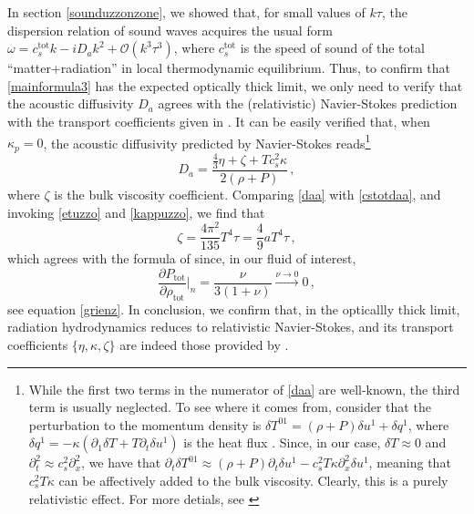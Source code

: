 \documentclass[a4paper, amsfonts, amssymb, amsmath, reprint, showkeys, nofootinbib, twoside,notitlepage,onecolumn]{revtex4-2}
\theoremstyle{definition}
\theoremstyle{theorem}
\theoremstyle{corollary}
\begin{document}
In section \ref{sounduzzonzone}, we showed that, for small values of $k\tau$, the dispersion relation of sound waves acquires the usual form $\omega=c_s^\text{tot} k-iD_a k^2+\mathcal{O}(k^3\tau^3)$, where $c_s^\text{tot}$ is the speed of sound of the total ``matter+radiation'' in local thermodynamic equilibrium. Thus, to confirm that \eqref{mainformula3} has the expected optically thick limit, we only need to verify that the acoustic diffusivity $D_a$ agrees with the (relativistic) Navier-Stokes prediction with the transport coefficients given in \cite{Weinberg1971,UdeyIsrael1982}. It can be easily verified that, when $\kappa_p=0$, the acoustic diffusivity predicted by Navier-Stokes reads\footnote{While the first two terms in the numerator of \eqref{daa} are well-known, the third term is usually neglected. To see where it comes from, consider that the perturbation to the momentum density is $\delta T^{01}=(\rho{+}P)\delta u^1 {+} \delta q^1$, where $\delta q^1 {=} {-}\kappa (\partial_1 \delta T{+}T\partial_t\delta u^1)$ is the heat flux \cite{Hiscock_Insatibility_first_order}. Since, in our case, $\delta T \approx 0$ and $\partial_t^2 \approx c_s^2 \partial^2_x$, we have that $\partial_t \delta T^{01} \approx(\rho {+}P)\partial_t \delta u^1-c_s^2 T \kappa \partial^2_x \delta u^1$, meaning that $c_s^2 T \kappa$ can be affectively added to the bulk viscosity. Clearly, this is a purely relativistic effect. For more detials, see \cite[Eq.s (2.55) and (2.57)]{Weinberg1971}}
\begin{equation}\label{daa}
D_a= \dfrac{\frac{4}{3} \eta{+}\zeta{+}Tc_s^2 \kappa }{2(\rho {+}P)} \, ,
\end{equation}
where $\zeta$ is the bulk viscosity coefficient. Comparing \eqref{daa} with \eqref{cstotdaa}, and invoking \eqref{etuzzo} and \eqref{kappuzzo}, we find that
\begin{equation}\label{zetuzzo}
\zeta=\dfrac{4\pi^2}{135} T^4 \tau= \dfrac{4}{9} aT^4 \tau \, ,
\end{equation}
which agrees with the formula of \cite{Weinberg1971,UdeyIsrael1982} since, in our fluid of interest,
\begin{equation}
    \dfrac{\partial P_\text{tot}}{\partial \rho_\text{tot}} \bigg|_n= \dfrac{\nu}{3(1{+}\nu)} \xrightarrow[]{\nu \rightarrow 0} 0 \, ,
\end{equation}
see equation \eqref{grienz}. In conclusion, we confirm that, in the opticallly thick limit, radiation hydrodynamics reduces to relativistic Navier-Stokes, and its transport coefficients $\{\eta,\kappa,\zeta \}$ are indeed those provided by \citet{Weinberg1971}. 
\end{document}
